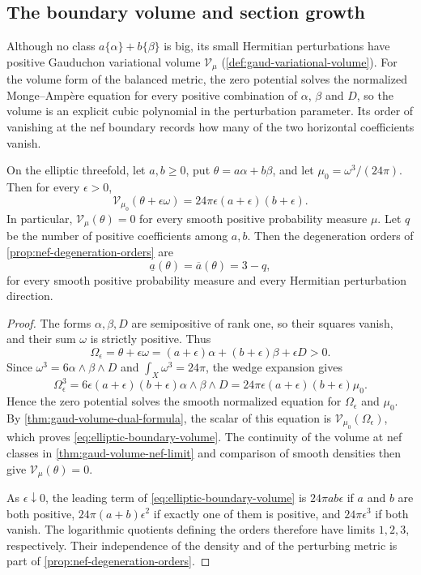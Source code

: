\subsection{The boundary volume and section growth}
\label{sec:elliptic-boundary-volume}

Although no class $a\{\alpha\}+b\{\beta\}$ is big, its small Hermitian perturbations have positive Gauduchon variational volume $\mathcal V_\mu$ (\cref{def:gaud-variational-volume}). For the volume form of the balanced metric, the zero potential solves the normalized Monge--Amp\`ere equation for every positive combination of $\alpha$, $\beta$ and $D$, so the volume is an explicit cubic polynomial in the perturbation parameter. Its order of vanishing at the nef boundary records how many of the two horizontal coefficients vanish.

\begin{proposition}\label{prop:elliptic-boundary-volume}
On the elliptic threefold, let $a,b\geq0$, put $\theta=a\alpha+b\beta$, and let $\mu_0=\omega^3/(24\pi)$. Then for every $\epsilon>0$,
\begin{equation}\label{eq:elliptic-boundary-volume}
 \mathcal V_{\mu_0}(\theta+\epsilon\omega)
       =24\pi\epsilon(a+\epsilon)(b+\epsilon).
\end{equation}
In particular, $\mathcal V_\mu(\theta)=0$ for every smooth positive probability measure $\mu$. Let $q$ be the number of positive coefficients among $a,b$. Then the degeneration orders of \cref{prop:nef-degeneration-orders} are
\[
 \underline a(\theta)=\overline a(\theta)=3-q,
\]
for every smooth positive probability measure and every Hermitian perturbation direction.
\end{proposition}
\begin{proof}
The forms $\alpha,\beta,D$ are semipositive of rank one, so their squares vanish, and their sum $\omega$ is strictly positive. Thus
\[
 \Omega_\epsilon=\theta+\epsilon\omega
       =(a+\epsilon)\alpha+(b+\epsilon)\beta+\epsilon D>0.
\]
Since $\omega^3=6\alpha\wedge\beta\wedge D$ and $\int_X\omega^3=24\pi$, the wedge expansion gives
\[
 \Omega_\epsilon^3
   =6\epsilon(a+\epsilon)(b+\epsilon)\alpha\wedge\beta\wedge D
   =24\pi\epsilon(a+\epsilon)(b+\epsilon)\mu_0.
\]
Hence the zero potential solves the smooth normalized equation for $\Omega_\epsilon$ and $\mu_0$. By \cref{thm:gaud-volume-dual-formula}, the scalar of this equation is $\mathcal V_{\mu_0}(\Omega_\epsilon)$, which proves \eqref{eq:elliptic-boundary-volume}. The continuity of the volume at nef classes in \cref{thm:gaud-volume-nef-limit} and comparison of smooth densities then give $\mathcal V_\mu(\theta)=0$.

As $\epsilon\downarrow0$, the leading term of \eqref{eq:elliptic-boundary-volume} is $24\pi ab\epsilon$ if $a$ and $b$ are both positive, $24\pi(a+b)\epsilon^2$ if exactly one of them is positive, and $24\pi\epsilon^3$ if both vanish. The logarithmic quotients defining the orders therefore have limits $1,2,3$, respectively. Their independence of the density and of the perturbing metric is part of \cref{prop:nef-degeneration-orders}.
\end{proof}

